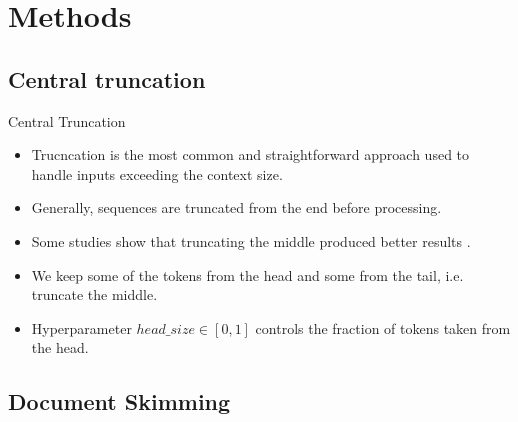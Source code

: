 \section{Methods}


\subsection{Central truncation}

\begin{frame}{Central Truncation}

  \begin{itemize}
    \item Trucncation is the most common and straightforward approach used to handle inputs exceeding the context size.
    \item Generally, sequences are truncated from the end before processing.
    \item Some studies show that truncating the middle produced better results \citep{sun2019fine, worsham-kalita-2018-genre}.
    \item We keep some of the tokens from the head and some from the tail, i.e. truncate the middle.
    \item Hyperparameter $head\_size \in [0, 1]$ controls the fraction of tokens taken from the head.
  \end{itemize}

\end{frame}


\subsection{Document Skimming}



